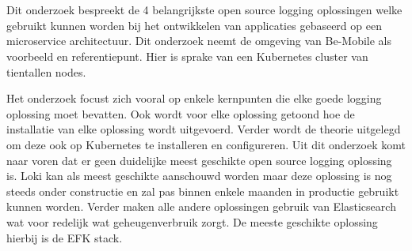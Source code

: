 
%
%

%



\chapter*{}

Dit onderzoek bespreekt de 4 belangrijkste open source logging oplossingen welke gebruikt kunnen worden bij het ontwikkelen van applicaties gebaseerd op een microservice architectuur. Dit onderzoek neemt de omgeving van Be-Mobile als voorbeeld en referentiepunt. Hier is sprake van een Kubernetes cluster van tientallen nodes. 

Het onderzoek focust zich vooral op enkele kernpunten die elke goede logging oplossing moet bevatten. Ook wordt voor elke oplossing getoond hoe de installatie van elke oplossing wordt uitgevoerd. Verder wordt de theorie uitgelegd om deze ook op Kubernetes te installeren en configureren. Uit dit onderzoek komt naar voren dat er geen duidelijke meest geschikte open source logging oplossing is. Loki kan als meest geschikte aanschouwd worden maar deze oplossing is nog steeds onder constructie en zal pas binnen enkele maanden in productie gebruikt kunnen worden. Verder maken alle andere oplossingen gebruik van Elasticsearch wat voor redelijk wat geheugenverbruik zorgt. De meeste geschikte oplossing hierbij is de EFK stack.
